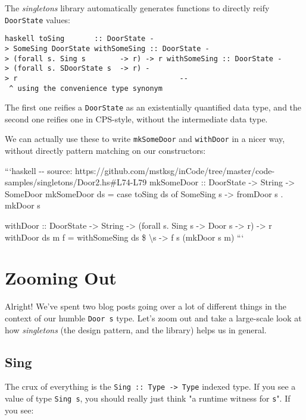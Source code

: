 \documentclass[]{article}
\begin{document}
The \emph{singletons} library automatically generates functions to directly
reify \texttt{DoorState} values:

\texttt{haskell\ toSing\ \ \ \ \ \ \ ::\ DoorState\ -\textgreater{}\ SomeSing\ DoorState\ withSomeSing\ ::\ DoorState\ -\textgreater{}\ (forall\ s.\ Sing\ s\ \ \ \ \ \ \ \ -\textgreater{}\ r)\ -\textgreater{}\ r\ withSomeSing\ ::\ DoorState\ -\textgreater{}\ (forall\ s.\ SDoorState\ s\ \ -\textgreater{}\ r)\ -\textgreater{}\ r\ \ \ \ \ \ \ \ \ \ \ \ \ \ \ \ \ \ \ \ \ \ \ \ \ \ \ \ \ \ \ \ \ \ \ \ \ \ -\/-\ \^{}\ using\ the\ convenience\ type\ synonym}

The first one reifies a \texttt{DoorState} as an existentially quantified data
type, and the second one reifies one in CPS-style, without the intermediate data
type.

We can actually use these to write \texttt{mkSomeDoor} and \texttt{withDoor} in
a nicer way, without directly pattern matching on our constructors:

```haskell -\/- source:
https://github.com/mstksg/inCode/tree/master/code-samples/singletons/Door2.hs\#L74-L79
mkSomeDoor :: DoorState -\textgreater{} String -\textgreater{} SomeDoor
mkSomeDoor ds = case toSing ds of SomeSing s -\textgreater{} fromDoor s . mkDoor
s

withDoor :: DoorState -\textgreater{} String -\textgreater{} (forall s. Sing s
-\textgreater{} Door s -\textgreater{} r) -\textgreater{} r withDoor ds m f =
withSomeSing ds \$ \textbackslash{}s -\textgreater{} f s (mkDoor s m) ```

\section{Zooming Out}

Alright! We've spent two blog posts going over a lot of different things in the
context of our humble \texttt{Door\ s} type. Let's zoom out and take a
large-scale look at how \emph{singletons} (the design pattern, and the library)
helps us in general.

\subsection{Sing}

The crux of everything is the \texttt{Sing\ ::\ Type\ -\textgreater{}\ Type}
indexed type. If you see a value of type \texttt{Sing\ s}, you should really
just think "a runtime witness for \texttt{s}". If you see:
\end{document}
